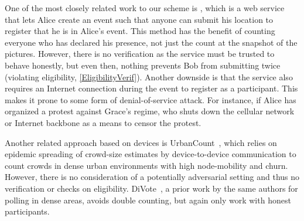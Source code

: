 One of the most closely related work to our scheme is \citet{CrowdCount}, which is a web service that lets Alice create an event such that anyone can submit his location to register that he is in Alice's event.
This method has the benefit of counting everyone who has declared his presence, not just the count at the snapshot of the pictures.
However, there is no verification as the service must be trusted to behave honestly, but even then, nothing prevents Bob from submitting twice (violating eligibility, \cref{EligibilityVerif}).
Another downside is that the service also requires an Internet connection during the event to register as a participant.
This makes it prone to some form of denial-of-service attack.
For instance, if Alice has organized a protest against Grace's regime, who shuts down the cellular network or Internet backbone as a means to censor the protest.

Another related approach based on devices is UrbanCount~\cite{UrbanCount}, which relies on epidemic spreading of crowd-size estimates by device-to-device communication to count crowds in dense urban environments with high node-mobility and churn.
However, there is no consideration of a potentially adversarial setting and thus no verification or checks on eligibility.  DiVote~\cite{DiVote}, a prior work by the same authors for polling in dense areas, avoids double counting, but again only work with honest participants.


